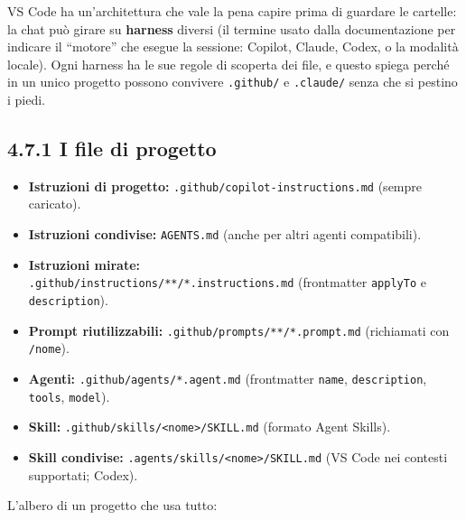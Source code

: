 \documentclass[
  italian,
  10pt,
]{book}
\providecommand{\tightlist}{%
  \setlength{\itemsep}{0pt}\setlength{\parskip}{0pt}}
\begin{document}
VS Code ha un'architettura che vale la pena capire prima di guardare le
cartelle: la chat può girare su \textbf{harness} diversi (il termine
usato dalla documentazione per indicare il ``motore'' che esegue la
sessione: Copilot, Claude, Codex, o la modalità locale). Ogni harness ha
le sue regole di scoperta dei file, e questo spiega perché in un unico
progetto possono convivere \texttt{.github/} e \texttt{.claude/} senza
che si pestino i piedi.

\subsection{4.7.1 I file di progetto}\label{i-file-di-progetto}

\begin{itemize}
\tightlist
\item
  \textbf{Istruzioni di progetto:}
  \texttt{.github/copilot-instructions.md} (sempre caricato).
\item
  \textbf{Istruzioni condivise:} \texttt{AGENTS.md} (anche per altri agenti
  compatibili).
\item
  \textbf{Istruzioni mirate:}
  \\
  \texttt{.github/instructions/**/*.instructions.md} (frontmatter
  \texttt{applyTo} e \texttt{description}).
\item
  \textbf{Prompt riutilizzabili:}
  \texttt{.github/prompts/**/*.prompt.md} (richiamati con
  \texttt{/nome}).
\item
  \textbf{Agenti:} \texttt{.github/agents/*.agent.md} (frontmatter
  \texttt{name}, \texttt{description}, \texttt{tools}, \texttt{model}).
\item
  \textbf{Skill:}
  \texttt{.github/skills/\textless{}nome\textgreater{}/SKILL.md}
  (formato Agent Skills).
\item
  \textbf{Skill condivise:}
  \texttt{.agents/skills/\textless{}nome\textgreater{}/SKILL.md}
  (VS Code nei contesti supportati; Codex).
\end{itemize}

L'albero di un progetto che usa tutto:
\end{document}
